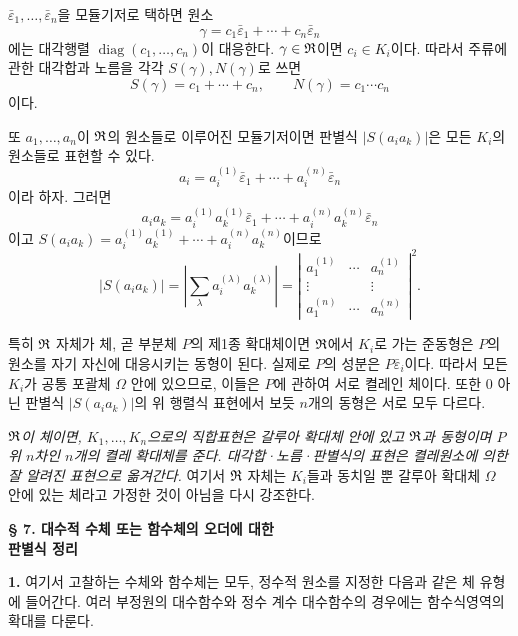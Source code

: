 \(\bar\varepsilon_1,\ldots,\bar\varepsilon_n\)을 모듈기저로 택하면 원소
\[
\gamma=c_1\bar\varepsilon_1+\cdots+c_n\bar\varepsilon_n
\]
에는 대각행렬 \(\operatorname{diag}(c_1,\ldots,c_n)\)이 대응한다. \(\gamma\in\mathfrak{R}\)이면 \(c_i\in K_i\)이다. 따라서 주류에 관한 대각합과 노름을 각각 \(S(\gamma),N(\gamma)\)로 쓰면
\[
S(\gamma)=c_1+\cdots+c_n,\qquad N(\gamma)=c_1\cdots c_n
\]
이다.

또 \(a_1,\ldots,a_n\)이 \(\mathfrak{R}\)의 원소들로 이루어진 모듈기저이면 판별식 \(|S(a_i a_k)|\)은 모든 \(K_i\)의 원소들로 표현할 수 있다. 
\[
a_i=a_i^{(1)}\bar\varepsilon_1+\cdots+a_i^{(n)}\bar\varepsilon_n
\]
이라 하자. 그러면
\[
a_i a_k=a_i^{(1)}a_k^{(1)}\bar\varepsilon_1+\cdots+a_i^{(n)}a_k^{(n)}\bar\varepsilon_n
\]
이고 \(S(a_i a_k)=a_i^{(1)}a_k^{(1)}+\cdots+a_i^{(n)}a_k^{(n)}\)이므로
\[
\left|S(a_i a_k)\right|
=
\left|\sum_{\lambda}a_i^{(\lambda)}a_k^{(\lambda)}\right|
=
\left|
\begin{matrix}
 a_1^{(1)}&\cdots&a_n^{(1)}\\
 \vdots&&\vdots\\
 a_1^{(n)}&\cdots&a_n^{(n)}
\end{matrix}
\right|^2.
\]

특히 \(\mathfrak{R}\) 자체가 체, 곧 부분체 \(P\)의 제1종 확대체이면 \(\mathfrak{R}\)에서 \(K_i\)로 가는 준동형은 \(P\)의 원소를 자기 자신에 대응시키는 동형이 된다. 실제로 \(P\)의 성분은 \(P\bar\varepsilon_i\)이다. 따라서 모든 \(K_i\)가 공통 포괄체 \(\Omega\) 안에 있으므로, 이들은 \(P\)에 관하여 서로 켤레인 체이다. 또한 0 아닌 판별식 \(|S(a_i a_k)|\)의 위 행렬식 표현에서 보듯 \(n\)개의 동형은 서로 모두 다르다.

\emph{\(\mathfrak{R}\)이 체이면, \(K_1,\ldots,K_n\)으로의 직합표현은 갈루아 확대체 안에 있고 \(\mathfrak{R}\)과 동형이며 \(P\) 위 \(n\)차인 \(n\)개의 켤레 확대체를 준다. 대각합·노름·판별식의 표현은 켤레원소에 의한 잘 알려진 표현으로 옮겨간다.} 여기서 \(\mathfrak{R}\) 자체는 \(K_i\)들과 동치일 뿐 갈루아 확대체 \(\Omega\) 안에 있는 체라고 가정한 것이 아님을 다시 강조한다.

\begin{center}
\textbf{§ 7. 대수적 수체 또는 함수체의 오더에 대한}\\
\textbf{판별식 정리}
\end{center}

\textbf{1.} 여기서 고찰하는 수체와 함수체는 모두, 정수적 원소를 지정한 다음과 같은 체 유형에 들어간다. 여러 부정원의 대수함수와 정수 계수 대수함수의 경우에는 함수식영역의 확대를 다룬다.

